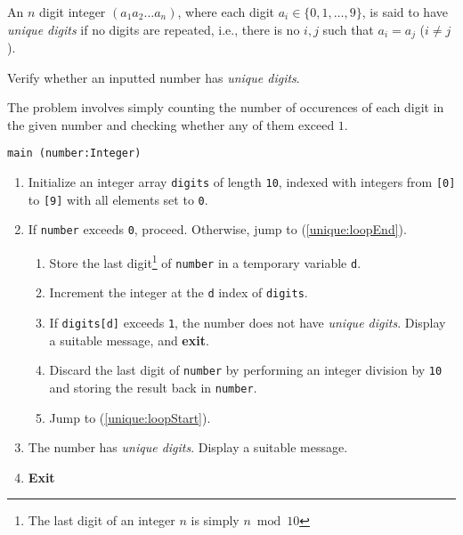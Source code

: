 

\problem An $n$ digit integer $(a_1a_2\dots a_n)$, where each digit $a_i \in \{0, 1, \dots, 9\}$,
is said to have {\em unique digits} if no digits are repeated, i.e., there is no $i, j$ such that $a_i = a_j$ ($i \neq j$).

Verify whether an inputted number has {\em unique digits}.

\solution The problem involves simply counting the number of occurences of each digit in the given number and checking whether any of them exceed $1$.

\algorithm
{\tt main (number:Integer)}
\begin{enumerate}
	\item	Initialize an integer array {\tt digits} of length {\tt 10}, indexed with integers
			from {\tt [0]} to {\tt [9]} with all elements set to {\tt 0}.
	\item	If {\tt number} exceeds {\tt 0}, proceed.
			Otherwise, jump to (\ref{unique:loopEnd}). \label{unique:loopStart}
	\begin{enumerate}
		\item	Store the last digit\footnote{The last digit of an integer $n$ is simply $n \bmod 10$}
				of {\tt number} in a temporary variable {\tt d}.
		\item	Increment the integer at the {\tt d} index of {\tt digits}.
		\item	If {\tt digits[d]} exceeds {\tt 1}, the number does not have {\em unique digits}. Display a suitable
				message, and {\bf exit}.
		\item	Discard the last digit of {\tt number} by performing an integer division by {\tt 10} and storing
				the result back in {\tt number}.
		\item	Jump to (\ref{unique:loopStart}).
	\end{enumerate}
	\item	The number has {\em unique digits}. Display a suitable message. \label{unique:loopEnd}
	\item	{\bf Exit}
\end{enumerate}

\clearpage
\sourcecode


